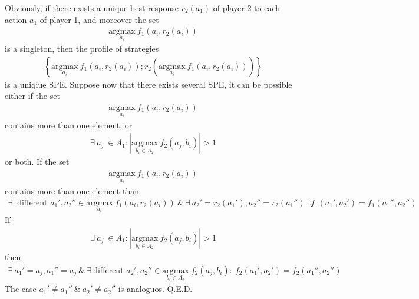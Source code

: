 \documentclass[a4paper]{article}
\begin{document}
Obviously, if there exists a unique best response $r_2(a_1)$ of player 2 to each action $a_1$ of player 1, and moreover the set
\begin{align*}
\underset{a_i}{\text{argmax}}\ f_1(a_i, r_2(a_i))
\end{align*} 
is a singleton, then the profile of strategies \begin{align*}
\left\{\underset{a_i}{\text{argmax}}\ f_1(a_i, r_2(a_i)); r_2(\underset{a_i}{\text{argmax}}\ f_1(a_i, r_2(a_i)))\right\}
\end{align*} 
is a uniqiue SPE. Suppose now that there exists several SPE, it can be possible either if the set
\begin{align*}
\underset{a_i}{\text{argmax}}\ f_1(a_i, r_2(a_i))
\end{align*}
contains more than one element, or
\begin{align*}
\exists\ a_j\ \in A_1: |\underset{b_i \in A_2}{\text{argmax}}\ f_2(a_j, b_i)| > 1
\end{align*}
or both. If the set
\begin{align*}
\underset{a_i}{\text{argmax}}\ f_1(a_i, r_2(a_i))
\end{align*}
contains more than one element than
\begin{align*}
\exists\ \text{ different } a_1', a_2'' \in \underset{a_i}{\text{argmax}}\ f_1(a_i, r_2(a_i))\ \&\ \exists\ a_2' = r_2(a_1'), a_2'' = r_2(a_1'')\ : f_1(a_1', a_2') = f_1(a_1'', a_2'')
\end{align*}
If
\begin{align*}
\exists\ a_j\ \in A_1: |\underset{b_i \in A_2}{\text{argmax}}\ f_2(a_j, b_i)| > 1
\end{align*}
then
\begin{align*}
\exists\ a_1' = a_j, a_1'' = a_j\ \&\ \exists\ \text{different } a_2', a_2'' \in \underset{b_i \in A_2}{\text{argmax}}\ f_2(a_j, b_i):\ f_2(a_1', a_2') = f_2(a_1'', a_2'')
\end{align*}
The case $a_1' \neq a_1''\ \&\ a_2' \neq a_2''$ is analoguos.
Q.E.D.
\end{document}
